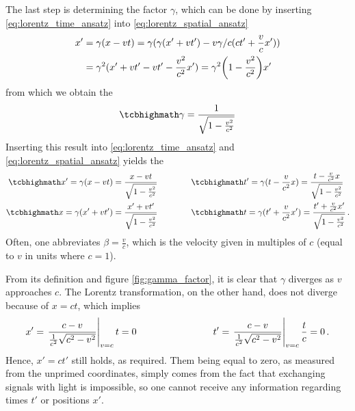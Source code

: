 The last step is determining the factor $\gamma$, which can be done by inserting \eqref{eq:lorentz_time_ansatz} into \eqref{eq:lorentz_spatial_ansatz}
\begin{align*}
x' &= \gamma (x - vt) = \gamma (\gamma (x' + vt') - v \gamma / c (ct' + \frac{v}{c} x'))
\\
&= \gamma^2 (x' + vt' - vt' - \frac{v^2}{c^2} x') = \gamma^2 \qty(1 - \frac{v^2}{c^2}) x'
\end{align*}
from which we obtain the 
\begin{equation}\label{eq:gamma_factor}
\eqbox{
\gamma = \frac{1}{\sqrt{1 - \frac{v^2}{c^2}}}
}
\end{equation}
Inserting this result into \eqref{eq:lorentz_time_ansatz} and \eqref{eq:lorentz_spatial_ansatz} yields the 
\begin{subequations}\label{eq:lorentz_trafo}
%
%
\begin{align}
\eqbox{
x' = \gamma (x - vt) = \frac{x - vt}{\sqrt{1 - \frac{v^2}{c^2}}}
}
\qquad & \qquad
\eqbox{
t' = \gamma (t - \frac{v}{c^2} x) = \frac{t - \frac{v}{c^2} x}{\sqrt{1 - \frac{v^2}{c^2}}}
}
\\
\eqbox{
x = \gamma (x' + vt') = \frac{x' + vt'}{\sqrt{1 - \frac{v^2}{c^2}}}
}
\qquad & \qquad
\eqbox{
t = \gamma (t' + \frac{v}{c^2} x') = \frac{t' + \frac{v}{c^2} x'}{\sqrt{1 - \frac{v^2}{c^2}}}
} \, .
\end{align}
\end{subequations}
Often, one abbreviates $\beta = \frac{v}{c}$, which is the velocity given in multiples of $c$ (equal to $v$ in units where $c = 1$).


From its definition and figure \ref{fig:gamma_factor}, it is clear that $\gamma$ diverges as $v$ approaches $c$. The Lorentz transformation, on the other hand, does not diverge because of $x = ct$, which implies
\begin{align*}
x' = \eval{\frac{c - v}{\frac{1}{c^2} \sqrt{c^2 - v^2}}}_{v = c} t = 0
\manyqquad
t' = \eval{\frac{c - v}{\frac{1}{c^2} \sqrt{c^2 - v^2}}}_{v = c} \frac{t}{c} = 0 \, .
\end{align*}
Hence, $x' = ct'$ still holds, as required. Them being equal to zero, as measured from the unprimed coordinates, simply comes from the fact that exchanging signals with light is impossible, so one cannot receive any information regarding times $t'$ or positions $x'$.



